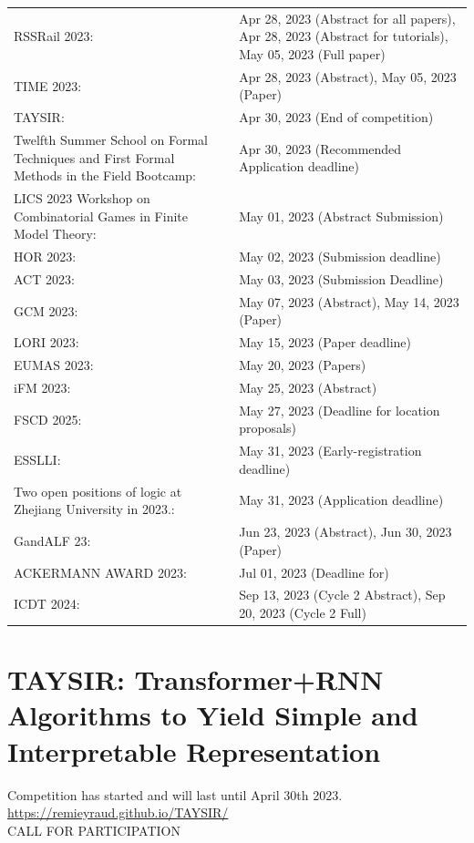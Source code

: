\documentclass[prodmode,acmtecs]{acmsmall} %
\begin{document}
\begin{tabulary}{\linewidth}{LL}
RSSRail 2023:  & Apr 28, 2023 (Abstract for all papers), Apr 28, 2023 (Abstract for tutorials), May 05, 2023 (Full paper) \\
TIME 2023:  & Apr 28, 2023 (Abstract), May 05, 2023 (Paper) \\
TAYSIR:  & Apr 30, 2023 (End of competition) \\
Twelfth Summer School on Formal Techniques and First Formal Methods in the Field Bootcamp:  & Apr 30, 2023 (Recommended Application deadline) \\
LICS 2023 Workshop on Combinatorial Games in Finite Model Theory:  & May 01, 2023 (Abstract Submission) \\
HOR 2023:  & May 02, 2023 (Submission deadline) \\
ACT 2023:  & May 03, 2023 (Submission Deadline) \\
GCM 2023:  & May 07, 2023 (Abstract), May 14, 2023 (Paper) \\
LORI 2023:  & May 15, 2023 (Paper deadline) \\
EUMAS 2023:  & May 20, 2023 (Papers) \\
iFM 2023:  & May 25, 2023 (Abstract) \\
FSCD 2025:  & May 27, 2023 (Deadline for location proposals) \\
ESSLLI:  & May 31, 2023 (Early-registration deadline) \\
Two open positions of logic at Zhejiang University in 2023.:  & May 31, 2023 (Application deadline) \\
GandALF 23:  & Jun 23, 2023 (Abstract), Jun 30, 2023 (Paper) \\
ACKERMANN AWARD 2023:  & Jul 01, 2023 (Deadline for) \\
ICDT 2024:  & Sep 13, 2023 (Cycle 2 Abstract), Sep 20, 2023 (Cycle 2 Full) \\
\end{tabulary}
\section{TAYSIR: Transformer+RNN Algorithms to Yield Simple and Interpretable Representation}\label{TAYSIR}  Competition has started and will last until April 30th 2023. \\ 
  \href{https://remieyraud.github.io/TAYSIR/}{https://remieyraud.github.io/TAYSIR/} \\ 
CALL FOR PARTICIPATION 
\end{document}
